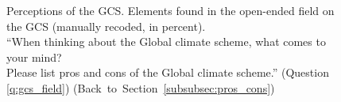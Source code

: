 \begin{figure}[h!]
    \caption[Classification of open-ended field on the GCS]{Perceptions of the GCS. Elements found in the open-ended field on the GCS (manually recoded, in percent). \\ ``When thinking about the Global climate scheme, what comes to
    your mind?
    \\ Please list pros and cons of the Global climate scheme.'' (Question \ref{q:gcs_field}) \hfill (Back~to~Section~\ref{subsubsec:pros_cons})}\label{fig:gcs_field}
\end{figure}

